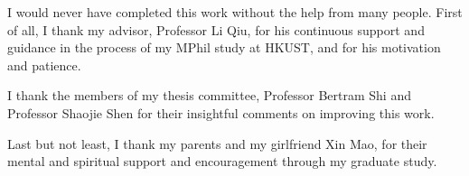 \acknowledgments

I would never have completed this work without the help from many people. First of all, I thank my advisor, Professor Li Qiu, for his continuous support and guidance in the process of my MPhil study at HKUST, and for his motivation and patience.

I thank the members of my thesis committee, Professor Bertram Shi and Professor Shaojie Shen for their insightful comments on improving this work.

Last but not least, I thank my parents and my girlfriend Xin Mao, for their mental and spiritual support and encouragement through my graduate study.

\endacknowledgments
